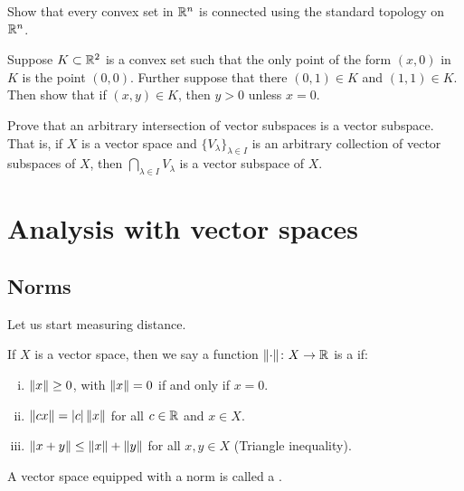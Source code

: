\begin{exercise}
Show that every convex set in ${\mathbb{R}}^n$ is connected using the standard
topology on ${\mathbb{R}}^n$.
\end{exercise}

\begin{exercise}
Suppose $K \subset {\mathbb{R}}^2$ is a convex set such that the only point of
the form $(x,0)$ in $K$ is the point $(0,0)$.  Further suppose that
there $(0,1) \in K$ and $(1,1) \in K$.  Then show that if $(x,y) \in K$,
then $y > 0$ unless $x=0$.
\end{exercise}

\begin{exercise}
Prove that an arbitrary intersection of vector subspaces
is a vector subspace.
That is, if $X$ is a vector space and
$\{ V_\lambda \}_{\lambda \in I}$ is
an arbitrary collection of vector subspaces of $X$,
then
$\bigcap_{\lambda \in I} V_\lambda$ is a vector subspace of $X$.
\end{exercise}


\sectionnewpage
\section{Analysis with vector spaces}
\label{sec:normsmatsdets}


\subsection{Norms}

Let us start measuring distance.

\begin{defn}
If $X$ is a vector space, then we say
a function $\lVert {\cdot} \rVert \colon X \to {\mathbb{R}}$ is a
\emph{} if:
\begin{enumerate}[(i)]
\item \label{defn:norm:i} $\lVert {x} \rVert \geq 0$, with $\lVert {x} \rVert=0$ if and only if $x=0$.
\item \label{defn:norm:ii} $\lVert {cx} \rVert = \lvert {c} \rvert \, \lVert {x} \rVert$ for all $c \in {\mathbb{R}}$ and $x \in X$.
\item \label{defn:norm:iii} $\lVert {x+y} \rVert \leq \lVert {x} \rVert+\lVert {y} \rVert$ for all $x,y \in X$
\qquad (Triangle inequality).
\end{enumerate}
A vector space equipped with a norm is called a
\emph{}.
\end{defn}

